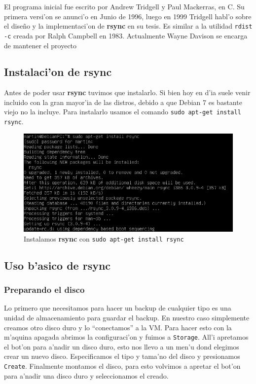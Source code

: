 \documentclass[11pt]{article}
\newcommand{\rsync}[0]{\textbf{rsync}}
\begin{document}
		El programa inicial fue escrito por Andrew Tridgell y Paul Mackerras, en C. Su primera versi'on se anunci'o en Junio de 1996, luego en 1999 Tridgell habl'o sobre el diseño y la implementaci'on de \rsync{} en su tesis. Es similar a la utilidad \texttt{rdist -c} creada por Ralph Campbell en 1983. Actualmente Wayne Davison se encarga de mantener el proyecto

	\subsection{Instalaci'on de rsync}
		Antes de poder usar \rsync{} tuvimos que instalarlo. Si bien hoy en d'ia suele venir incluido con la gran mayor'ia de las distros, debido a que Debian 7 es bastante viejo no la incluye. Para instalarlo usamos el comando \texttt{sudo apt-get install rsync}.

		\begin{figure}[H]
    			\centering
    			\includegraphics[scale=0.7]{Images/rsync/rsync_install.PNG}
    			\caption{Instalamos \rsync{} con \texttt{sudo apt-get install rsync}}
    			\label{fig:rsync_install}
		\end{figure}

	\subsection{Uso b'asico de rsync}
	\subsubsection{Preparando el disco}
		Lo primero que necesitamos para hacer un backup de cualquier tipo es una unidad de almacenamiento para guardar el backup. En nuestro caso simplemente creamos otro disco duro y lo ``conectamos'' a la VM. Para hacer esto con la m'aquina apagada abrimos la configuraci'on y fuimos a \texttt{Storage}. All'i apretamos el bot'on para a'nadir un disco duro, esto nos llevo a un men'u  dond elegimos crear un nuevo disco. Especificamos el tipo y tama'no del disco y presionamos \texttt{Create}. Finalmente montamos el disco, para esto volvimos a apretar el bot'on para a'nadir una disco duro y seleccionamos el creado.
\end{document}
